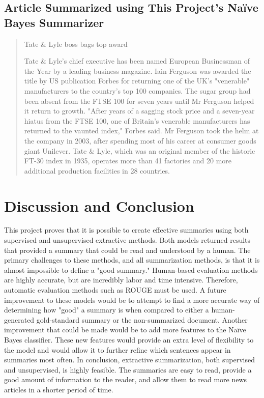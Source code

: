 \documentclass{IEEEtran}
\begin{document}
\subsection{Article Summarized using This Project's Na\"{i}ve Bayes Summarizer}
\begin{quotation}
Tate \& Lyle boss bags top award

Tate \& Lyle's chief executive has been named European Businessman of the Year by a leading business magazine. Iain Ferguson was awarded the title by US publication Forbes for returning one of the UK's "venerable" manufacturers to the country's top 100 companies. The sugar group had been absent from the FTSE 100 for seven years until Mr Ferguson helped it return to growth. "After years of a sagging stock price and a seven-year hiatus from the FTSE 100, one of Britain's venerable manufacturers has returned to the vaunted index," Forbes said. Mr Ferguson took the helm at the company in 2003, after spending most of his career at consumer goods giant Unilever. Tate \& Lyle, which was an original member of the historic FT-30 index in 1935, operates more than 41 factories and 20 more additional production facilities in 28 countries.
\label{quotation:nb-summarized}
\end{quotation}

\section{Discussion and Conclusion}
This project proves that it is possible to create effective summaries using both supervised and unsupervised extractive methods. Both models returned results that provided a summary that could be read and understood by a human. The primary challenges to these methods, and all summarization methods, is that it is almost impossible to define a "good summary." Human-based evaluation methods are highly accurate, but are incredibly labor and time intensive. Therefore, automatic evaluation methods such as ROUGE must be used. A future improvement to these models would be to attempt to find a more accurate way of determining how "good" a summary is when compared to either a human-generated gold-standard summary or the non-summarized document. Another improvement that could be made would be to add more features to the Na\"{i}ve Bayes classifier. These new features would provide an extra level of flexibility to the model and would allow it to further refine which sentences appear in summaries most often. In conclusion, extractive summarization, both supervised and unsupervised, is highly feasible. The summaries are easy to read, provide a good amount of information to the reader, and allow them to read more news articles in a shorter period of time.





\end{document}
